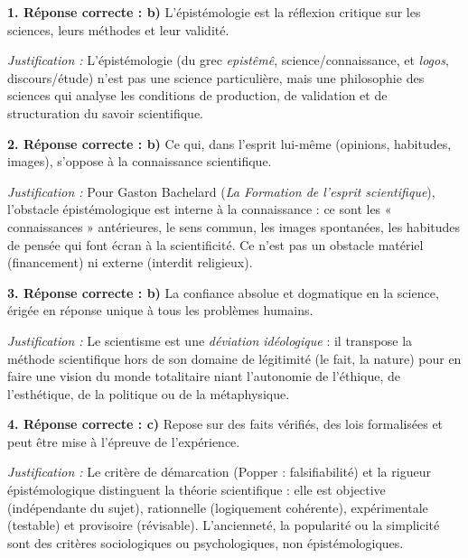 \documentclass[11pt]{article}
\newcommand{\cle}[1]{{\popxbold\color{popdark}#1}}
\begin{document}
\begin{corrige}
\textbf{1. Réponse correcte : b)} L'épistémologie est la réflexion critique sur les sciences, leurs méthodes et leur validité.
\par\emph{Justification :} L'épistémologie (du grec \emph{epistêmê}, science/connaissance, et \emph{logos}, discours/étude) n'est pas une science particulière, mais une \cle{philosophie des sciences} qui analyse les conditions de production, de validation et de structuration du savoir scientifique.

\textbf{2. Réponse correcte : b)} Ce qui, dans l'esprit lui-même (opinions, habitudes, images), s'oppose à la connaissance scientifique.
\par\emph{Justification :} Pour Gaston Bachelard (\emph{La Formation de l'esprit scientifique}), l'\cle{obstacle épistémologique} est interne à la connaissance : ce sont les « connaissances » antérieures, le sens commun, les images spontanées, les habitudes de pensée qui font écran à la scientificité. Ce n'est pas un obstacle matériel (financement) ni externe (interdit religieux).

\textbf{3. Réponse correcte : b)} La confiance absolue et dogmatique en la science, érigée en réponse unique à tous les problèmes humains.
\par\emph{Justification :} Le \cle{scientisme} est une \emph{déviation idéologique} : il transpose la méthode scientifique hors de son domaine de légitimité (le fait, la nature) pour en faire une \cle{vision du monde} totalitaire niant l'autonomie de l'éthique, de l'esthétique, de la politique ou de la métaphysique.

\textbf{4. Réponse correcte : c)} Repose sur des faits vérifiés, des lois formalisées et peut être mise à l'épreuve de l'expérience.
\par\emph{Justification :} Le critère de démarcation (Popper : \cle{falsifiabilité}) et la rigueur épistémologique distinguent la théorie scientifique : elle est \cle{objective} (indépendante du sujet), \cle{rationnelle} (logiquement cohérente), \cle{expérimentale} (testable) et \cle{provisoire} (révisable). L'ancienneté, la popularité ou la simplicité sont des critères sociologiques ou psychologiques, non épistémologiques.
\end{corrige}
\end{document}
